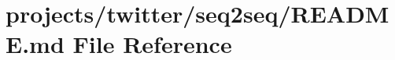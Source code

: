 \hypertarget{projects_2twitter_2seq2seq_2README_8md}{}\section{projects/twitter/seq2seq/\+R\+E\+A\+D\+ME.md File Reference}
\label{projects_2twitter_2seq2seq_2README_8md}
